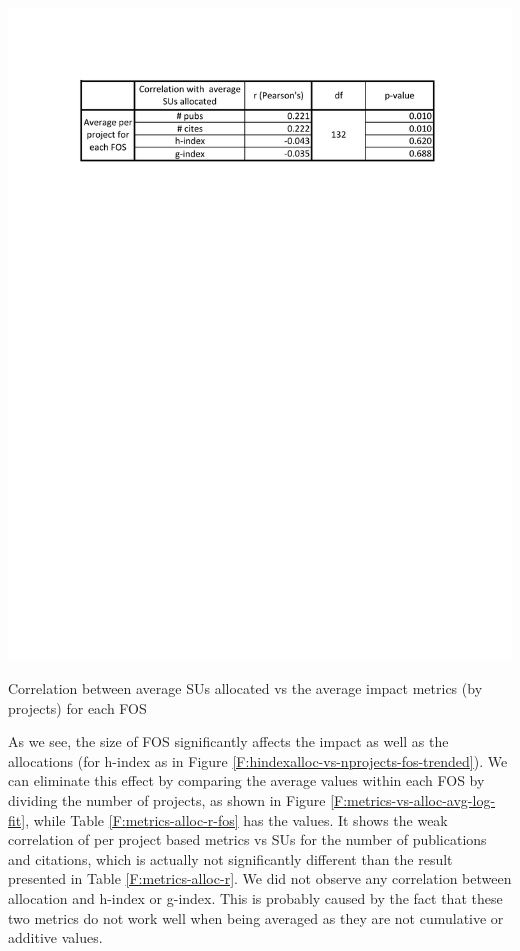 \documentclass{sig-alternate}
\begin{document}
\begin{table}[!htb] 
  \centering 
    \includegraphics[width=1.0\columnwidth]{images/metrics_alloc_r_fos.pdf} 
  \caption{Correlation between average SUs allocated vs the average impact metrics (by projects) for each FOS}\label{F:metrics-alloc-r-fos} 
\end{table} 
 
As we see, the size of FOS significantly affects the impact as well as the allocations (for h-index as in Figure \ref{F:hindexalloc-vs-nprojects-fos-trended}). We can eliminate this effect by comparing the average values within each FOS by dividing the number of projects, as shown in Figure \ref{F:metrics-vs-alloc-avg-log-fit}, while Table \ref{F:metrics-alloc-r-fos} has the values. It shows the weak correlation of per project based metrics vs SUs for the number of publications and citations, which is actually not significantly different than the result presented in Table \ref{F:metrics-alloc-r}. We did not observe any correlation between allocation and h-index or g-index. This is probably caused by the fact that these two metrics do not work well when being averaged as they are not cumulative or additive values.
 
\end{document}
